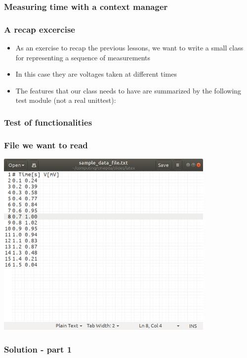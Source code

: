\documentclass[9pt]{beamer}
\begin{document}
\begin{frame}
  \frametitle{Measuring time with a context manager}
  
\end{frame}


\begin{frame}
  \frametitle{A recap excercise}
  \begin{itemize}
    \item As an exercise to recap the previous lessons, we want to write a 
          small class for representing a sequence of measurements
    \item In this case they are voltages taken at different times
    \item The features that our class needs to have are summarized by the following
          test module (not a real unittest):
  \end{itemize}
  
\end{frame}


\begin{frame}
  \frametitle{Test of functionalities}
  
\end{frame}



\begin{frame}
  \frametitle{File we want to read}
  \centering
  \includegraphics[width=0.8\textwidth]{voltage_file.png}
\end{frame}


\begin{frame}
  \frametitle{Solution - part 1}
  
\end{frame}
\end{document}
